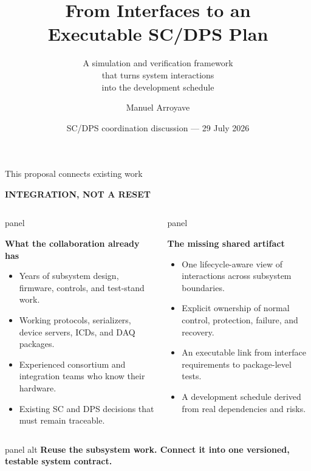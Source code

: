 \documentclass[aspectratio=169,10pt]{beamer}
\title[Executable SC/DPS Plan]{From Interfaces to an\\Executable SC/DPS Plan}
\subtitle{A simulation and verification framework\\that turns system interactions\\into the development schedule}
\author{Manuel Arroyave}
\date{SC/DPS coordination discussion --- 29 July 2026}
\newcommand{\eyebrow}[1]{{\color{noircyan}\scriptsize\bfseries #1\par}}
\newcommand{\tightitem}{%
  \setlength{\itemsep}{0.8mm}%
  \setlength{\parskip}{0pt}%
}
\newcommand{\fixedpanel}[4][panel]{%
  \begin{beamercolorbox}[wd=\linewidth,sep=4pt,rounded=true]{#1}
    \begin{minipage}[t][#2][t]{\dimexpr\linewidth-8pt\relax}
      \raggedright
      {\usebeamercolor[fg]{#1}\bfseries #3\par}
      \vspace{0.45mm}
      {\usebeamercolor[fg]{#1}\footnotesize #4\par}
    \end{minipage}
  \end{beamercolorbox}
}
\begin{document}
{
\begin{frame}
  \titlepage
\end{frame}
}

\begin{frame}[t]{This proposal connects existing work}
\eyebrow{INTEGRATION, NOT A RESET}
\vspace{1.2mm}

\begin{columns}[T,onlytextwidth]
\fixedpanel{4.0cm}{What the collaboration already has}{
\begin{itemize}\tightitem
  \item Years of subsystem design, firmware, controls, and test-stand work.
  \item Working protocols, serializers, device servers, ICDs, and DAQ packages.
  \item Experienced consortium and integration teams who know their hardware.
  \item Existing SC and DPS decisions that must remain traceable.
\end{itemize}
}

\fixedpanel{4.0cm}{The missing shared artifact}{
\begin{itemize}\tightitem
  \item One lifecycle-aware view of interactions across subsystem boundaries.
  \item Explicit ownership of normal control, protection, failure, and recovery.
  \item An executable link from interface requirements to package-level tests.
  \item A development schedule derived from real dependencies and risks.
\end{itemize}
}
\end{columns}

\vspace{1.2mm}
\begin{beamercolorbox}[wd=\linewidth,sep=6pt,rounded=true]{panel alt}
\centering
\color{white}\bfseries
Reuse the subsystem work. Connect it into one versioned, testable system contract.
\end{beamercolorbox}
\end{frame}
\end{document}
